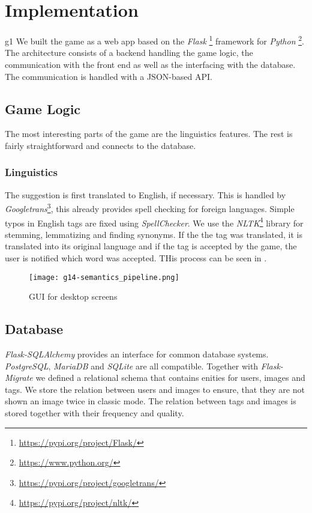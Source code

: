 \section{Implementation}
\label{g14:sec:implementation}

g1
We built the game as a web app based on the \textit{Flask} \footnote{\url{https://pypi.org/project/Flask/}} framework for \textit{Python} \footnote{\url{https://www.python.org/}}. The architecture consists of a backend handling the game logic, the communication with the front end as well as the interfacing with the database. The communication is handled with a JSON-based API.

\subsection{Game Logic}
\label{g14:sec:implementation:game}

The most interesting parts of the game are the linguistics features. The rest is fairly straightforward and connects to the database.

\subsubsection{Linguistics}
\label{g14:sec:implementation:linguistics}
The suggestion is first translated to English, if necessary. This is handled by \textit{Googletrans}\footnote{\url{https://pypi.org/project/googletrans/}}, this already provides spell checking for foreign languages.
Simple typos in English tags are fixed using \textit{SpellChecker}. We use the \textit{NLTK}\footnote{\url{https://pypi.org/project/nltk/}} library for stemming, lemmatizing and finding synonyms. If the the tag was translated, it is translated into its original language and if the tag is accepted by the game, the user is notified which word was accepted. THis process can be seen in .

\begin{figure}[tb]
	\centering
	\texttt{[image: g14-semantics\_pipeline.png]}
	\caption{GUI for desktop screens}
	\label{g14:fig:semanticpipeline}
\end{figure}

\subsection{Database}
\label{g14:sec:implementation:database}
\textit{Flask-SQLAlchemy} provides an interface for common database systems. \textit{PostgreSQL}, \textit{MariaDB} and \textit{SQLite} are all compatible.
Together with \textit{Flask-Migrate} we defined a relational schema that contains enities for users, images and tags. We store the relation between users and images to ensure, that they are not shown an image twice in classic mode. The relation between tags and images is stored together with their frequency and quality.

